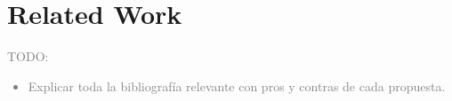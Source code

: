 
\section{Related Work}

\textcolor{gray}{TODO: 
\begin{itemize}
    \item Explicar toda la bibliografía relevante con pros y contras de cada propuesta.
\end{itemize}
}
